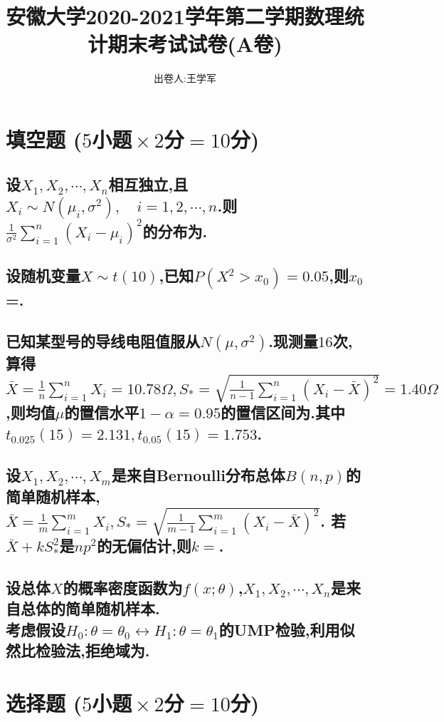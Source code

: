 \documentclass[UTF8]{article}
\title{安徽大学2020-2021学年第二学期数理统计期末考试试卷(A卷)}
\author{出卷人:王学军}
\date{}
\newcommand{\shortline}{\underline{\hspace{1cm}}}
\newcommand{\longline}{\underline{\hspace{2cm}}}
\begin{document}
    \maketitle
    \section{填空题 \small($5\!\!$小题$\!\!\times 2\!\!$分$\!\!=\!\!10\!\!$分)}
    \subsection{
        设$X_1,X_2,\cdots,X_n$相互独立,且$X_i\sim N(\mu_i,\sigma^2),\quad i=1,2,\cdots,n$.则$\displaystyle \frac{1}{\sigma^2}\sum_{i=1}^{n} \left( X_i-\mu_i \right)^2$的分布为\longline.
    }
    \subsection{
        设随机变量$X\sim t(10)$,已知$P(X^2>x_0)=0.05$,则$x_0$=\shortline.
    }
    \subsection{
        已知某型号的导线电阻值服从$\!\!N(\mu,\sigma^2)$.现测量$\!\!16\!$次,算得$\displaystyle \!\!\bar{X}\!=\!\frac{1}{n}\sum_{i=1}^nX_i\!=\!10.78\Omega,S_*\!=\!\sqrt{\frac{1}{n\!-\!1}\sum_{i=1}^n(X_i-\bar{X})^2}=1.40 \Omega$,则均值$\mu$的置信水平$1-\alpha=0.95$的置信区间为\longline.其中$t_{0.025}(15)=2.131,t_{0.05}(15)=1.753$.
    }
    \subsection{
        设$X_1,X_2,\cdots,X_m$是来自Bernoulli分布总体$B(n,p)$的简单随机样本,$\displaystyle \bar{X}=\frac{1}{m}\sum_{i=1}^mX_i,S_*=\sqrt{\frac{1}{m-1}\sum_{i=1}^m(X_i-\bar{X})^2}$. 若$\bar{X}+kS_*^2$是$np^2$的无偏估计,则$k=$\shortline.
    }
    \subsection{
        设总体$X$的概率密度函数为$f(x;\theta)$,$X_1,X_2,\cdots,X_n$是来自总体的简单随机样本.\\ 考虑假设$H_0:\theta=\theta_0\leftrightarrow H_1:\theta=\theta_1$的UMP检验,利用似然比检验法,拒绝域为\longline.
    }

    \section{选择题 \small($5\!\!$小题$\!\!\times 2\!\!$分$\!\!=\!\!10\!\!$分)}
\end{document}
